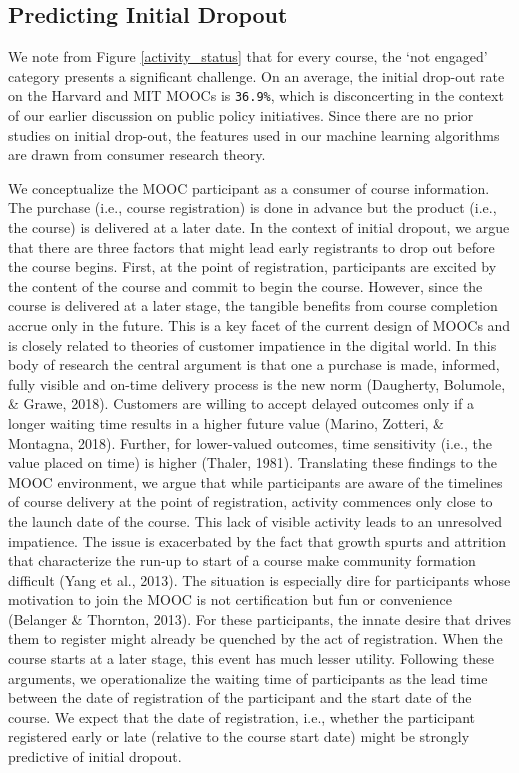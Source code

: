 \documentclass[12pt,]{article}
\begin{document}
\subsection{Predicting Initial
Dropout}\label{predicting-initial-dropout}

We note from Figure \ref{activity_status} that for every course, the
`not engaged' category presents a significant challenge. On an average,
the initial drop-out rate on the Harvard and MIT MOOCs is
\texttt{36.9\%}, which is disconcerting in the context of our earlier
discussion on public policy initiatives. Since there are no prior
studies on initial drop-out, the features used in our machine learning
algorithms are drawn from consumer research theory.

We conceptualize the MOOC participant as a consumer of course
information. The purchase (i.e., course registration) is done in advance
but the product (i.e., the course) is delivered at a later date. In the
context of initial dropout, we argue that there are three factors that
might lead early registrants to drop out before the course begins.
First, at the point of registration, participants are excited by the
content of the course and commit to begin the course. However, since the
course is delivered at a later stage, the tangible benefits from course
completion accrue only in the future. This is a key facet of the current
design of MOOCs and is closely related to theories of customer
impatience in the digital world. In this body of research the central
argument is that one a purchase is made, informed, fully visible and
on-time delivery process is the new norm (Daugherty, Bolumole, \& Grawe,
2018). Customers are willing to accept delayed outcomes only if a longer
waiting time results in a higher future value (Marino, Zotteri, \&
Montagna, 2018). Further, for lower-valued outcomes, time sensitivity
(i.e., the value placed on time) is higher (Thaler, 1981). Translating
these findings to the MOOC environment, we argue that while participants
are aware of the timelines of course delivery at the point of
registration, activity commences only close to the launch date of the
course. This lack of visible activity leads to an unresolved impatience.
The issue is exacerbated by the fact that growth spurts and attrition
that characterize the run-up to start of a course make community
formation difficult (Yang et al., 2013). The situation is especially
dire for participants whose motivation to join the MOOC is not
certification but fun or convenience (Belanger \& Thornton, 2013). For
these participants, the innate desire that drives them to register might
already be quenched by the act of registration. When the course starts
at a later stage, this event has much lesser utility. Following these
arguments, we operationalize the waiting time of participants as the
lead time between the date of registration of the participant and the
start date of the course. We expect that the date of registration, i.e.,
whether the participant registered early or late (relative to the course
start date) might be strongly predictive of initial dropout.
\end{document}

